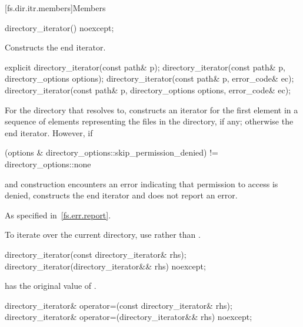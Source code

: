 [fs.dir.itr.members]{Members}

%
\begin{itemdecl}
directory_iterator() noexcept;
\end{itemdecl}

\begin{itemdescr}
\pnum
\effects
Constructs the end iterator.
\end{itemdescr}

%
\begin{itemdecl}
explicit directory_iterator(const path& p);
directory_iterator(const path& p, directory_options options);
directory_iterator(const path& p, error_code& ec);
directory_iterator(const path& p, directory_options options, error_code& ec);
\end{itemdecl}

\begin{itemdescr}
\pnum
\effects
For the directory that  resolves to, constructs an
iterator for the first element in a sequence of 
elements representing the files in the directory, if any; otherwise the end
iterator. However, if
\begin{codeblock}
(options & directory_options::skip_permission_denied) != directory_options::none
\end{codeblock}
and construction encounters an error indicating
that permission to access  is denied, constructs the end iterator
and does not report an error.

\pnum
\throws
As specified in~\ref{fs.err.report}.

\pnum
\begin{note}
To iterate over the current directory, use  rather than .
\end{note}
\end{itemdescr}

%
\begin{itemdecl}
directory_iterator(const directory_iterator& rhs);
directory_iterator(directory_iterator&& rhs) noexcept;
\end{itemdecl}

\begin{itemdescr}
\pnum
\ensures
{} has the original value of .
\end{itemdescr}

%
\begin{itemdecl}
directory_iterator& operator=(const directory_iterator& rhs);
directory_iterator& operator=(directory_iterator&& rhs) noexcept;
\end{itemdecl}

